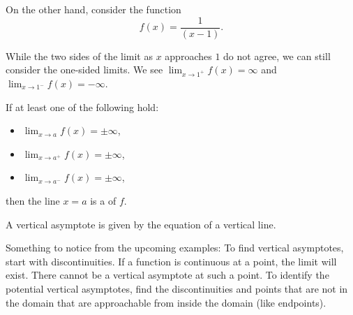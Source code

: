 \documentclass{ximera}
\begin{document}
On the other hand, consider the function 
\[
f(x) = \frac{1}{(x-1)}.
\]
\begin{image}
\end{image}
While the two sides of the limit as $x$ approaches $1$ do not agree, we can still consider the one-sided
limits.  We see $\lim_{x\to 1^+} f(x) = \infty$ and $\lim_{x\to 1^-} f(x) =
-\infty$.


\begin{definition}\label{def:vert asymptote}
	If at least one of the following hold:
	\begin{itemize}
		\item $\lim_{x\to a} f(x) = \pm\infty$,
		\item $\lim_{x\to a^+} f(x) = \pm\infty$,
		\item $\lim_{x\to a^-} f(x) = \pm\infty$,
	\end{itemize}
	then the line $x=a$ is a  of $f$.
\end{definition}

\begin{warning}
	A vertical asymptote is given by the equation of a vertical line.
\end{warning}

Something to notice from the upcoming examples: To find vertical asymptotes, start with discontinuities. If a function is continuous at a point, the
limit will exist. There cannot be a vertical asymptote at such a point. To identify the potential vertical asymptotes, find the discontinuities and points
that are not in the domain that are approachable from inside the domain (like endpoints).
\end{document}
